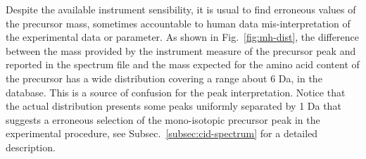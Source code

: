 Despite the available 
instrument sensibility, it is usual to find erroneous values of
the precursor mass, sometimes accountable to human data mis-interpretation of
the experimental data or parameter.
As shown in Fig.~\ref{fig:mh-dist}, the difference between the mass provided by
the instrument measure of the precursor peak and reported in the spectrum file
and the mass expected for the amino acid content of the precursor has a wide
distribution covering a range about 6 Da, in the database.
This is a source of confusion for the peak interpretation.
Notice that the actual distribution presents some peaks uniformly separated by 1
Da that suggests a erroneous selection of the mono-isotopic precursor peak in
the experimental procedure, see Subsec.~\ref{subsec:cid-spectrum} for a detailed
description.
\begin{figure}
\centering
{}
\\

\end{figure}
